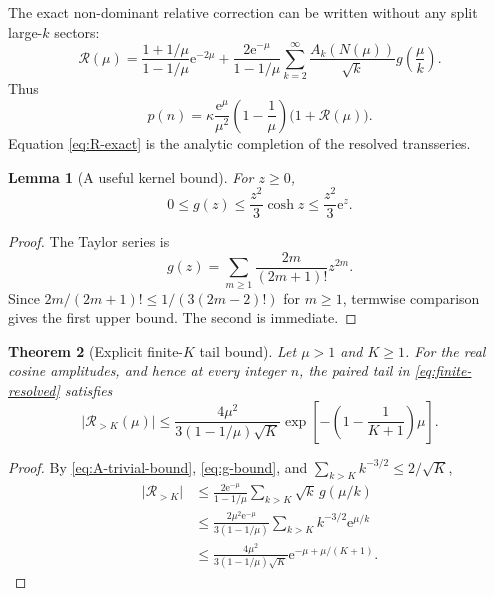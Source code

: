 \documentclass[11pt,a4paper]{article}
\numberwithin{equation}{section}
\newtheorem{theorem}{Theorem}[section]
\newtheorem{lemma}[theorem]{Lemma}
\theoremstyle{definition}
\theoremstyle{remark}
\newcommand{\e}{\mathrm e}
\newcommand{\Rcal}{\mathcal R}
\newcommand{\abs}[1]{\lvert#1\rvert}
\begin{document}
The exact non-dominant relative correction can be written without any split
large-$k$ sectors:
\begin{equation}\label{eq:R-exact}
 \Rcal(\mu)=
 \frac{1+1/\mu}{1-1/\mu}\e^{-2\mu}
 +\frac{2\e^{-\mu}}{1-1/\mu}
 \sum_{k=2}^{\infty}\frac{A_k(N(\mu))}{\sqrt{k}}
 g\!\left(\frac\mu k\right).
\end{equation}
Thus
\begin{equation}\label{eq:exact-factorization}
 p(n)=\kappa\frac{\e^\mu}{\mu^2}
 \left(1-\frac1\mu\right)\bigl(1+\Rcal(\mu)\bigr).
\end{equation}
Equation \eqref{eq:R-exact} is the analytic completion of the resolved
transseries.

\begin{lemma}[A useful kernel bound]\label{lem:g-bound}
For $z\geq0$,
\begin{equation}\label{eq:g-bound}
 0\leq g(z)\leq \frac{z^2}{3}\cosh z
 \leq \frac{z^2}{3}\e^z.
\end{equation}
\end{lemma}

\begin{proof}
The Taylor series is
\[
 g(z)=\sum_{m\geq1}\frac{2m}{(2m+1)!}z^{2m}.
\]
Since
$2m/(2m+1)!\leq1/(3(2m-2)!)$ for $m\geq1$, termwise comparison gives the
first upper bound.  The second is immediate.
\end{proof}

\begin{theorem}[Explicit finite-$K$ tail bound]\label{thm:tail-bound}
Let $\mu>1$ and $K\geq1$.  For the real cosine amplitudes, and hence at every
integer $n$, the paired tail in \eqref{eq:finite-resolved} satisfies
\begin{equation}\label{eq:tail-bound}
 \abs{\Rcal_{>K}(\mu)}
 \leq
 \frac{4\mu^2}{3(1-1/\mu)\sqrt K}
 \exp\!\left[-\left(1-\frac1{K+1}\right)\mu\right].
\end{equation}
\end{theorem}

\begin{proof}
By \eqref{eq:A-trivial-bound}, \eqref{eq:g-bound}, and
$\sum_{k>K}k^{-3/2}\leq2/\sqrt K$,
\begin{align*}
 \abs{\Rcal_{>K}}
 &\leq \frac{2\e^{-\mu}}{1-1/\mu}
 \sum_{k>K}\sqrt{k}\,g(\mu/k)\\
 &\leq \frac{2\mu^2\e^{-\mu}}{3(1-1/\mu)}
 \sum_{k>K}k^{-3/2}\e^{\mu/k}\\
 &\leq \frac{4\mu^2}{3(1-1/\mu)\sqrt K}
 \e^{-\mu+\mu/(K+1)}.
\end{align*}
\end{proof}
\end{document}

